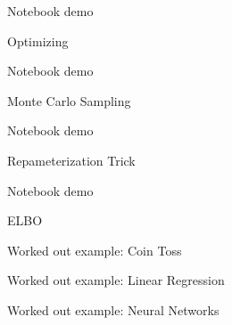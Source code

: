 \documentclass{beamer}
\begin{document}
\begin{frame}
    Notebook demo
\end{frame}

\begin{frame}{Optimizing}
    
\end{frame}

\begin{frame}
    Notebook demo
\end{frame}

\begin{frame}{Monte Carlo Sampling}
    
\end{frame}

\begin{frame}
    Notebook demo
\end{frame}

\begin{frame}{Repameterization Trick}
    
\end{frame}

\begin{frame}
    Notebook demo
\end{frame}

\begin{frame}{ELBO}
\end{frame}
    
\begin{frame}{Worked out example: Coin Toss}
   
\end{frame}

\begin{frame}{Worked out example: Linear Regression}
    
\end{frame}

\begin{frame}{Worked out example: Neural Networks}
\end{frame}

    
\end{document}
